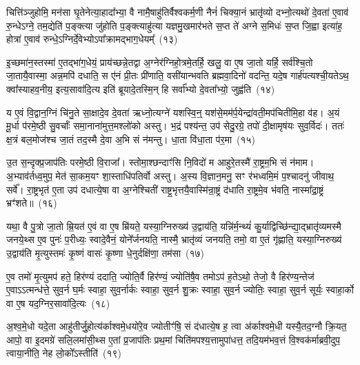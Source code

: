 {\anuvakamend[{उपै॒तान्धारा॑यै॒ षट्च॑त्वारिꣳशच्च}]}%

चित्ति॑ञ्जुहोमि॒ मन॑सा घृ॒तेनेत्या॒हादा᳚भ्या॒ वै नामै॒षाहु॑तिर्वैश्वकर्म॒णी नैनं॑ चिक्या॒नं भ्रातृ॑व्यो दभ्नो॒त्यथो॑ दे॒वता॑ ए॒वाव॑ रु॒न्धे\-ऽग्ने॒ तम॒द्येति॑ प॒ङ्क्त्या जु॑होति प॒ङ्क्त्याहु॑त्या यज्ञमु॒खमार॑भते स॒प्त ते॑ अग्ने स॒मिधः॑ स॒प्त जि॒ह्वा इत्या॑ह॒ होत्रा॑ ए॒वाव॑ रुन्धे॒\-ऽग्निर्दे॒वेभ्यो\-ऽपा᳚क्रामद्भाग॒धेयम्᳚~(१३)

इ॒च्छमा॑न॒स्तस्मा॑ ए॒तद्भा॑ग॒धेयं॒ प्राय॑च्छन्ने॒तद्वा अ॒ग्नेर॑ग्निहो॒त्रमे॒तर्\mbox{}हि॒ खलु॒ वा ए॒ष जा॒तो यर्\mbox{}हि॒ सर्व॑श्चि॒तो जा॒तायै॒वास्मा॒ अन्न॒मपि॑ दधाति॒ स ए॑नं प्री॒तः प्री॑णाति॒ वसी॑यान्भवति ब्रह्मवा॒दिनो॑ वदन्ति॒ यदे॒ष गार्\mbox{}ह॑पत्यश्ची॒यते\-ऽथ॒ क्वा᳚स्याहव॒नीय॒ इत्य॒सावा॑दि॒त्य इति॑ ब्रूयादे॒तस्मि॒न् हि सर्वा᳚भ्यो दे॒वता᳚भ्यो॒ जुह्व॑ति~(१४)

य ए॒वं वि॒द्वान॒ग्निं चि॑नु॒ते सा॒क्षादे॒व दे॒वता॑ ऋध्नो॒त्यग्ने॑ यशस्वि॒न्॒ यश॑से॒मम॑र्प॒येन्द्रा॑वती॒मप॑चितीमि॒हा व॑ह। अ॒यं मू॒र्धा प॑रमे॒ष्ठी सु॒वर्चाः᳚ समा॒नाना॑मुत्त॒मश्लो॑को अस्तु। भ॒द्रं पश्य॑न्त॒ उप॑ सेदु॒रग्रे॒ तपो॑ दी॒क्षामृष॑यः सुव॒र्विदः॑। ततः॑ क्ष॒त्रं बल॒मोज॑श्च जा॒तं तद॒स्मै दे॒वा अ॒भि सं न॑मन्तु। धा॒ता वि॑धा॒ता प॑र॒मा~(१५)

उ॒त स॒न्दृक्प्र॒जा\-प॑तिः परमे॒ष्ठी वि॒राजा᳚। स्तोमा॒श्छन्दाꣳ॑सि नि॒विदो॑ म आहुरे॒तस्मै॑ रा॒ष्ट्रम॒भि सं न॑माम। अ॒भ्याव॑र्तध्व॒मुप॒ मेत॑ सा॒कम॒यꣳ शा॒स्ताधि॑पतिर्वो अस्तु। अ॒स्य वि॒ज्ञान॒मनु॒ सꣳ र॑भध्वमि॒मं प॒श्चादनु॑ जीवाथ॒ सर्वे᳚। रा॒ष्ट्रभृत॑ ए॒ता उप॑ दधात्ये॒षा वा अ॒ग्नेश्चिती॑ राष्ट्र॒भृत्तयै॒वास्मि॑न्रा॒ष्ट्रं द॑धाति रा॒ष्ट्रमे॒व भ॑वति॒ नास्मा᳚द्रा॒ष्ट्रं भ्रꣳ॑शते॥~(१६)

{\anuvakamend[{भा॒ग॒धेय॒ञ्जुह्व॑ति पर॒मा रा॒ष्ट्रं द॑धाति स॒प्त च॑}]}%

यथा॒ वै पु॒त्रो जा॒तो म्रि॒यत॑ ए॒वं वा ए॒ष म्रि॑यते॒ यस्या॒ग्निरुख्य॑ उ॒द्वाय॑ति॒ यन्नि॑र्म॒न्थ्यं॑ कु॒र्याद्विच्छि॑न्द्या॒द्भ्रातृ॑व्यमस्मै जनये॒थ्स ए॒व पुनः॑ प॒रीध्यः॒ स्वादे॒वैनं॒ योने᳚र्जनयति॒ नास्मै॒ भ्रातृ॑व्यं जनयति॒ तमो॒ वा ए॒तं गृ॑ह्णाति॒ यस्या॒ग्निरुख्य॑ उ॒द्वाय॑ति मृ॒त्युस्तमः॑ कृ॒ष्णं वासः॑ कृ॒ष्णा धे॒नुर्दक्षि॑णा॒ तम॑सा~(१७)

ए॒व तमो॑ मृ॒त्युमप॑ हते॒ हिर॑ण्यं ददाति॒ ज्योति॒र्वै हिर॑ण्यं॒ ज्योति॑षै॒व तमो\-ऽप॑ ह॒ते\-ऽथो॒ तेजो॒ वै हिर॑ण्य॒न्तेज॑ ए॒वा\-ऽऽ\-त्मन्ध॑त्ते॒ सुव॒र्न घ॒र्मः स्वाहा॒ सुव॒र्नार्कः स्वाहा॒ सुव॒र्न शु॒क्रः स्वाहा॒ सुव॒र्न ज्योतिः॒ स्वाहा॒ सुव॒र्न सूर्यः॒ स्वाहा॒र्को वा ए॒ष यद॒ग्निर॒सावा॑दि॒त्यः~(१८)

अ॒श्व॒मे॒धो यदे॒ता आहु॑तीर्जु॒होत्य॑र्काश्वमे॒धयो॑रे॒व ज्योतीꣳ॑षि॒ सं द॑धात्ये॒ष ह॒ त्वा अ॑र्काश्वमे॒धी यस्यै॒तद॒ग्नौ क्रि॒यत॒ आपो॒ वा इ॒दमग्रे॑ सलि॒लमा॑सी॒थ्स ए॒तां प्र॒जा\-प॑तिः प्रथ॒मां चिति॑मपश्य॒त्तामुपा॑धत्त॒ तदि॒यम॑भव॒त्तं वि॒श्वक॑र्माब्रवी॒दुप॒ त्वाया॒नीति॒ नेह लो॒को᳚\-ऽस्तीति॑~(१९)

